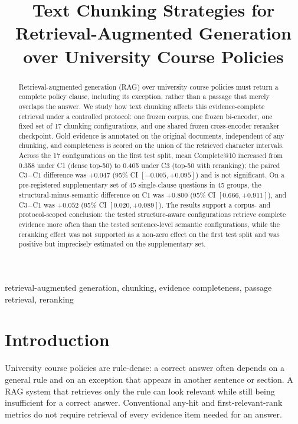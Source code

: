 \documentclass[conference]{IEEEtran}
\begin{document}
\title{Text Chunking Strategies for Retrieval-Augmented Generation over University Course Policies}

\author{
}

\maketitle

\begin{abstract}
Retrieval-augmented generation (RAG) over university course policies must return a complete policy clause, including its exception, rather than a passage that merely overlaps the answer. We study how text chunking affects this evidence-complete retrieval under a controlled protocol: one frozen corpus, one frozen bi-encoder, one fixed set of 17 chunking configurations, and one shared frozen cross-encoder reranker checkpoint. Gold evidence is annotated on the original documents, independent of any chunking, and completeness is scored on the union of the retrieved character intervals. Across the 17 configurations on the first test split, mean Complete@10 increased from 0.358 under C1 (dense top-50) to 0.405 under C3 (top-50 with reranking); the paired C3$-$C1 difference was $+0.047$ (95\% CI $[-0.005,+0.095]$) and is not significant. On a pre-registered supplementary set of 45 single-clause questions in 45 groups, the structural-minus-semantic difference on C1 was $+0.800$ (95\% CI $[0.666,+0.911]$), and C3$-$C1 was $+0.052$ (95\% CI $[0.020,+0.089]$). The results support a corpus- and protocol-scoped conclusion: the tested structure-aware configurations retrieve complete evidence more often than the tested sentence-level semantic configurations, while the reranking effect was not supported as a non-zero effect on the first test split and was positive but imprecisely estimated on the supplementary set.
\end{abstract}

\begin{IEEEkeywords}
retrieval-augmented generation, chunking, evidence completeness, passage retrieval, reranking
\end{IEEEkeywords}

\section{Introduction}
University course policies are rule-dense: a correct answer often depends on a general rule and on an exception that appears in another sentence or section. A RAG system that retrieves only the rule can look relevant while still being insufficient for a correct answer. Conventional any-hit and first-relevant-rank metrics do not require retrieval of every evidence item needed for an answer.
\end{document}
